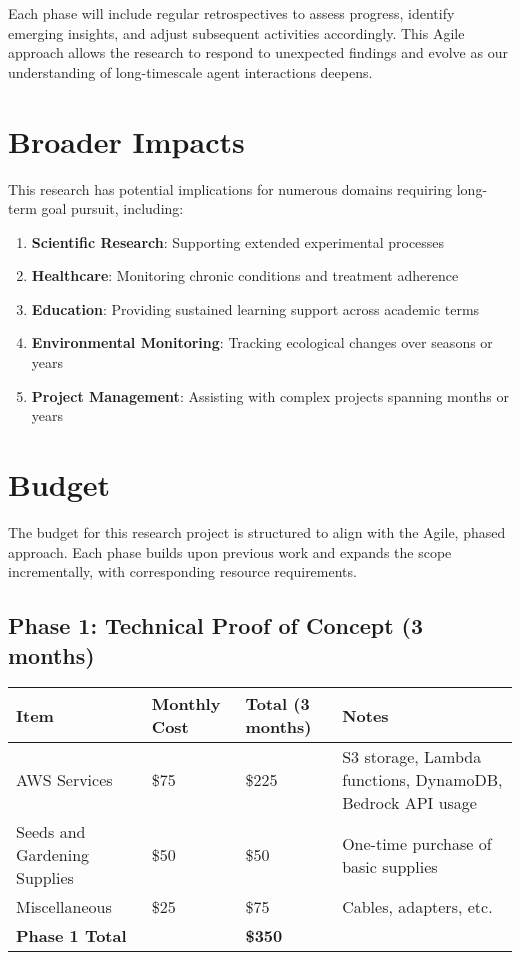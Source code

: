 \documentclass[12pt,letterpaper]{article}
\begin{document}
Each phase will include regular retrospectives to assess progress, identify emerging insights, and adjust subsequent activities accordingly. This Agile approach allows the research to respond to unexpected findings and evolve as our understanding of long-timescale agent interactions deepens.

\section{Broader Impacts}

This research has potential implications for numerous domains requiring long-term goal pursuit, including:

\begin{enumerate}
    \item \textbf{Scientific Research}: Supporting extended experimental processes
    \item \textbf{Healthcare}: Monitoring chronic conditions and treatment adherence
    \item \textbf{Education}: Providing sustained learning support across academic terms
    \item \textbf{Environmental Monitoring}: Tracking ecological changes over seasons or years
    \item \textbf{Project Management}: Assisting with complex projects spanning months or years
\end{enumerate}

\section{Budget}

The budget for this research project is structured to align with the Agile, phased approach. Each phase builds upon previous work and expands the scope incrementally, with corresponding resource requirements.

\subsection{Phase 1: Technical Proof of Concept (3 months)}
\begin{table}[H]
\centering
\begin{tabular}{@{}llll@{}}
\toprule
\textbf{Item} & \textbf{Monthly Cost} & \textbf{Total (3 months)} & \textbf{Notes} \\
\midrule
AWS Services & \$75 & \$225 & S3 storage, Lambda functions, DynamoDB, Bedrock API usage \\
Seeds and Gardening Supplies & \$50 & \$50 & One-time purchase of basic supplies \\
Miscellaneous & \$25 & \$75 & Cables, adapters, etc. \\
\midrule
\textbf{Phase 1 Total} & & \textbf{\$350} & \\
\bottomrule
\end{tabular}
\end{table}
\end{document}
